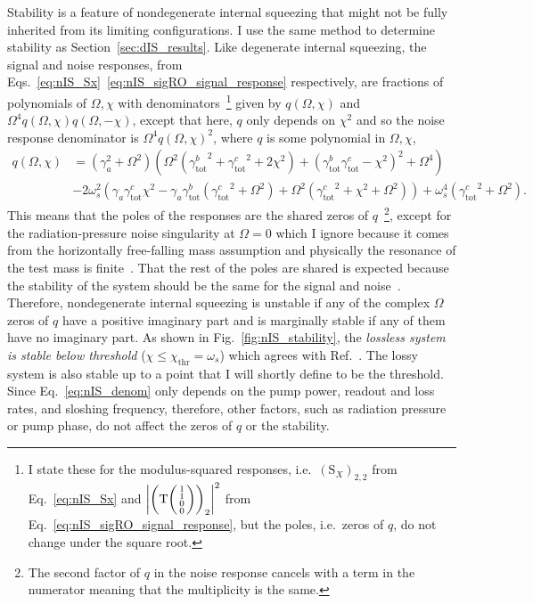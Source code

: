 Stability is a feature of nondegenerate internal squeezing that might not be fully inherited from its limiting configurations. I use the same method to determine stability as Section~\ref{sec:dIS_results}. Like degenerate internal squeezing, the signal and noise responses, from Eqs.~\ref{eq:nIS_Sx}~\ref{eq:nIS_sigRO_signal_response} respectively, are fractions of polynomials of $\Omega, \chi$ with denominators~\footnote{I state these for the modulus-squared responses, i.e.\ $(\text{S}_X)_{2,2}$ from Eq.~\ref{eq:nIS_Sx} and $\abs{\left(\text{T}\begin{psmallmatrix}1 \\1\\0\\0\end{psmallmatrix}\right)_2}^2$ from Eq.~\ref{eq:nIS_sigRO_signal_response}, but the poles, i.e.\ zeros of $q$, do not change under the square root.} given by $q(\Omega,\chi)$ and $\Omega^4 q(\Omega,\chi) q(\Omega,-\chi)$, except that here, $q$ only depends on $\chi^2$ and so the noise response denominator is $\Omega^4 q(\Omega,\chi)^2$, where $q$ is some polynomial in $\Omega, \chi$, 
\begin{align}\label{eq:nIS_denom}
q(\Omega,\chi)&=\left(\gamma_a^2+\Omega ^2\right) \left(\Omega ^2 \left({\gamma^b_\text{tot}}^2+{\gamma^c_\text{tot}}^2+2 \chi ^2\right)+\left({\gamma^b_\text{tot}} {\gamma^c_\text{tot}}-\chi ^2\right)^2+\Omega ^4\right)\\
&-2 \omega_s^2 \left(\gamma_a {\gamma^c_\text{tot}} \chi ^2-\gamma_a {\gamma^b_\text{tot}} \left({\gamma^c_\text{tot}}^2+\Omega ^2\right)+\Omega ^2 \left({\gamma^c_\text{tot}}^2+\chi ^2+\Omega ^2\right)\right)+\omega_s^4 \left({\gamma^c_\text{tot}}^2+\Omega ^2\right).\nonumber
\end{align}
This means that the poles of the responses are the shared zeros of $q$~\footnote{The second factor of $q$ in the noise response cancels with a term in the numerator meaning that the multiplicity is the same.}, except for the radiation-pressure noise singularity at $\Omega=0$ which I ignore because it comes from the horizontally free-falling mass assumption and physically the resonance of the test mass is finite~\cite{}. That the rest of the poles are shared is expected because the stability of the system should be the same for the signal and noise~\cite{}.
Therefore, nondegenerate internal squeezing is unstable if any of the complex $\Omega$ zeros of $q$ have a positive imaginary part and is marginally stable if any of them have no imaginary part. As shown in Fig.~\ref{fig:nIS_stability}, the \emph{lossless system is stable below threshold} ($\chi\leq\chi_\text{thr}=\omega_s$) which agrees with Ref.~\cite{liBroadbandSensitivityImprovement2020}. The lossy system is also stable up to a point that I will shortly define to be the threshold. %
Since Eq.~\ref{eq:nIS_denom} only depends on the pump power, readout and loss rates, and sloshing frequency, therefore, other factors, such as radiation pressure or pump phase, do not affect the zeros of $q$ or the stability.


